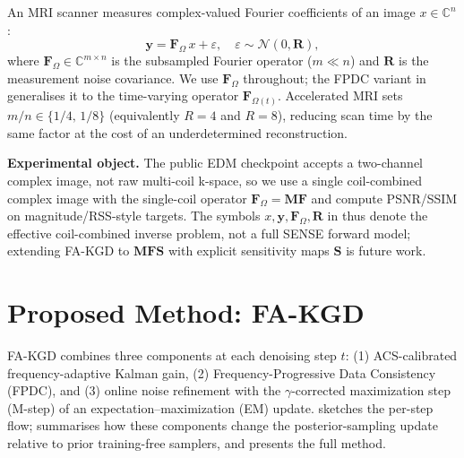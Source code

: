\documentclass[10pt,twocolumn,letterpaper]{article}
\begin{document}
An MRI scanner measures complex-valued Fourier coefficients of an image
$x \in \mathbb{C}^n$:
\begin{equation}
  \mathbf{y} = \mathbf{F}_\Omega\,x + \varepsilon, \quad
  \varepsilon \sim \mathcal{N}(0, \mathbf{R}),
  \label{eq:forward}
\end{equation}
where $\mathbf{F}_\Omega \in \mathbb{C}^{m \times n}$ is the subsampled Fourier
operator ($m \ll n$) and $\mathbf{R}$ is the measurement noise covariance. We use
$\mathbf{F}_\Omega$ throughout; the FPDC variant in 
generalises it to the time-varying operator $\mathbf{F}_{\Omega(t)}$.
Accelerated MRI sets $m/n \in \{1/4,\, 1/8\}$ (equivalently $R{=}4$ and
$R{=}8$), reducing scan time by the same factor at the cost of an
underdetermined reconstruction.

\textbf{Experimental object.} The public EDM checkpoint accepts a two-channel
complex image, not raw multi-coil k-space, so we use a single coil-combined
complex image with the single-coil operator
$\mathbf{F}_\Omega=\mathbf{M}\mathbf{F}$ and compute PSNR/SSIM on
magnitude/RSS-style targets. The symbols $x,\mathbf{y},\mathbf{F}_\Omega,\mathbf{R}$
in  thus denote the effective coil-combined inverse problem,
not a full SENSE forward model; extending FA-KGD to
$\mathbf{M}\mathbf{F}\mathbf{S}$ with explicit sensitivity maps $\mathbf{S}$ is
future work.

\section{Proposed Method: FA-KGD}
\label{sec:method}

FA-KGD combines three components at each denoising step $t$:
(1) ACS-calibrated frequency-adaptive Kalman gain, (2) Frequency-Progressive
Data Consistency (FPDC), and (3) online noise refinement with the
$\gamma$-corrected maximization step (M-step) of an
expectation--maximization (EM) update.  sketches the per-step flow; 
summarises how these components change the posterior-sampling update relative to
prior training-free samplers, and  presents the full method.
\end{document}
